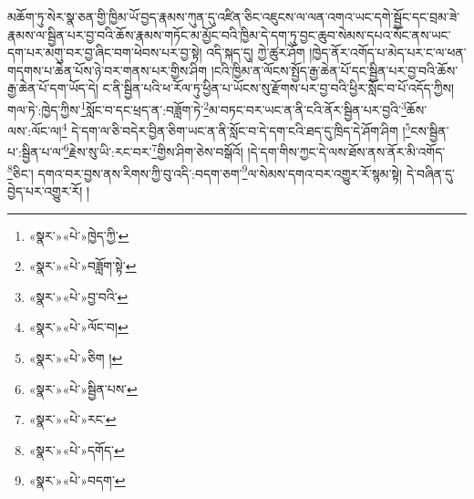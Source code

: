 མཆོག་ཏུ་སེར་སྣ་ཅན་གྱི་ཁྱིམ་ཡོ་བྱད་རྣམས་ཀུན་དུ་འཛིན་ཅིང་འཇུངས་ལ་ལན་འགའ་ཡང་དགེ་སྦྱོང་དང་བྲམ་ཟེ་རྣམས་ལ་སྦྱིན་པར་བྱ་བའི་ཆོས་རྣམས་གཏོང་མ་མྱོང་བའི་ཁྱིམ་དེ་དག་ཏུ་བྱང་ཆུབ་སེམས་དཔའ་སོང་ནས་ཡང་དག་པར་མགུ་བར་བྱ་ཞིང་བག་ཕེབས་པར་བྱ་སྟེ། འདི་སྐད་དུ། ཀྱེ་ཚུར་ཤོག །ཁྱེད་ནོར་འགོད་པ་མེད་པར་ང་ལ་ཕན་གདགས་པ་ཆེན་པོས་ཉེ་བར་གནས་པར་གྱིས་ཤིག །ངའི་ཁྱིམ་ན་ལོངས་སྤྱོད་རྒྱ་ཆེན་པོ་དང་སྦྱིན་པར་བྱ་བའི་ཆོས་རྒྱ་ཆེན་པོ་དག་ཡོད་དེ། ང་ནི་སྦྱིན་པའི་ཕ་རོལ་ཏུ་ཕྱིན་པ་ཡོངས་སུ་རྫོགས་པར་བྱ་བའི་ཕྱིར་སློང་བ་པོ་འདོད་ཀྱིས། གལ་ཏེ་:ཁྱེད་ཀྱིས་\footnote{«སྣར་»«པེ་»ཁྱེད་ཀྱི་}སློང་བ་དང་ཕྲད་ན་:བཟློག་ཏེ་\footnote{«སྣར་»«པེ་»བཟློག་སྟེ་}མ་བཏང་བར་ཡང་ན་ནི་ངའི་ནོར་སྦྱིན་པར་བྱའི་\footnote{«སྣར་»«པེ་»བྱ་བའི་}ཆོས་ལས་:ལོང་ལ།\footnote{«སྣར་»«པེ་»ལོང་བ།} དེ་དག་ལ་ཅི་བདེར་བྱིན་ཅིག་ཡང་ན་ནི་སློང་བ་དེ་དག་ངའི་ཐད་དུ་ཁྲིད་དེ་ཤོག་ཤིག །\footnote{«སྣར་»«པེ་»ཅིག །}ངས་སྦྱིན་པ་:སྦྱིན་པ་ལ་\footnote{«སྣར་»«པེ་»སྦྱིན་པས་}རྗེས་སུ་ཡི་:རང་བར་\footnote{«སྣར་»«པེ་»རང་}གྱིས་ཤིག་ཅེས་བསྒོའོ། །དེ་དག་གིས་ཀྱང་དེ་ལས་ཐོས་ནས་ནོར་མི་འགོད་\footnote{«སྣར་»«པེ་»དགོད་}ཅིང་། དགའ་བར་བྱས་ནས་རིགས་ཀྱི་བུ་འདི་:བདག་ཅག་\footnote{«སྣར་»«པེ་»བདག་}ལ་སེམས་དགའ་བར་འགྱུར་རོ་སྙམ་སྟེ། དེ་བཞིན་དུ་བྱེད་པར་འགྱུར་རོ། །
